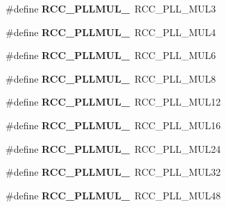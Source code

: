 \begin{DoxyCompactItemize}
\#define {\bfseries R\+C\+C\+\_\+\+P\+L\+L\+M\+U\+L\+\_}~R\+C\+C\+\_\+\+P\+L\+L\+\_\+\+M\+U\+L3
\item 
\mbox{\label{group___h_a_l___r_c_c___aliased_ga48cf05c73391e2319b0be6b2a3c9d9c9}} 
\#define {\bfseries R\+C\+C\+\_\+\+P\+L\+L\+M\+U\+L\+\_}~R\+C\+C\+\_\+\+P\+L\+L\+\_\+\+M\+U\+L4
\item 
\mbox{\label{group___h_a_l___r_c_c___aliased_gacbc14a066a66d57867c5f1f5a3669201}} 
\#define {\bfseries R\+C\+C\+\_\+\+P\+L\+L\+M\+U\+L\+\_}~R\+C\+C\+\_\+\+P\+L\+L\+\_\+\+M\+U\+L6
\item 
\mbox{\label{group___h_a_l___r_c_c___aliased_gaa2dc44220ad0fa4e951fa2bd64b3b154}} 
\#define {\bfseries R\+C\+C\+\_\+\+P\+L\+L\+M\+U\+L\+\_}~R\+C\+C\+\_\+\+P\+L\+L\+\_\+\+M\+U\+L8
\item 
\mbox{\label{group___h_a_l___r_c_c___aliased_gaeb9e97f00772bed44ea9dae4788b16d0}} 
\#define {\bfseries R\+C\+C\+\_\+\+P\+L\+L\+M\+U\+L\+\_}~R\+C\+C\+\_\+\+P\+L\+L\+\_\+\+M\+U\+L12
\item 
\mbox{\label{group___h_a_l___r_c_c___aliased_ga303c5bb3511ab4dc8afc78eb8a94db6e}} 
\#define {\bfseries R\+C\+C\+\_\+\+P\+L\+L\+M\+U\+L\+\_}~R\+C\+C\+\_\+\+P\+L\+L\+\_\+\+M\+U\+L16
\item 
\mbox{\label{group___h_a_l___r_c_c___aliased_ga7d51be10ed74280f60e1b1a288d6c039}} 
\#define {\bfseries R\+C\+C\+\_\+\+P\+L\+L\+M\+U\+L\+\_}~R\+C\+C\+\_\+\+P\+L\+L\+\_\+\+M\+U\+L24
\item 
\mbox{\label{group___h_a_l___r_c_c___aliased_ga5e0e486ea8123942d2a3efeb188cf4c0}} 
\#define {\bfseries R\+C\+C\+\_\+\+P\+L\+L\+M\+U\+L\+\_}~R\+C\+C\+\_\+\+P\+L\+L\+\_\+\+M\+U\+L32
\item 
\mbox{\label{group___h_a_l___r_c_c___aliased_ga01940fad545c1b60aef08279a569edfa}} 
\#define {\bfseries R\+C\+C\+\_\+\+P\+L\+L\+M\+U\+L\+\_}~R\+C\+C\+\_\+\+P\+L\+L\+\_\+\+M\+U\+L48
\item 

\end{DoxyCompactItemize}
